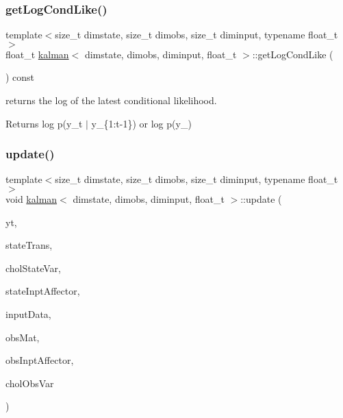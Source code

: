 \subsubsection{\texorpdfstring{get\+Log\+Cond\+Like()}{getLogCondLike()}}
{\footnotesize\ttfamily template$<$size\+\_\+t dimstate, size\+\_\+t dimobs, size\+\_\+t diminput, typename float\+\_\+t $>$ \\
float\+\_\+t \hyperlink{classkalman}{kalman}$<$ dimstate, dimobs, diminput, float\+\_\+t $>$\+::get\+Log\+Cond\+Like (\begin{DoxyParamCaption}{ }\end{DoxyParamCaption}) const}



returns the log of the latest conditional likelihood. 

\begin{DoxyReturn}{Returns}
log p(y\+\_\+t $\vert$ y\+\_\+\{1\+:t-\/1\}) or log p(y\+\_) 
\end{DoxyReturn}
\mbox{\label{classkalman_a55f914729a1d7de38a672c95b9efdaae}} 
\subsubsection{\texorpdfstring{update()}{update()}}
{\footnotesize\ttfamily template$<$size\+\_\+t dimstate, size\+\_\+t dimobs, size\+\_\+t diminput, typename float\+\_\+t $>$ \\
void \hyperlink{classkalman}{kalman}$<$ dimstate, dimobs, diminput, float\+\_\+t $>$\+::update (\begin{DoxyParamCaption}\item[{const \hyperlink{classkalman_a0172e54797a5d5b0acc4168894adc6d5}{osv} \&}]{yt,  }\item[{const \hyperlink{classkalman_a581550d9aba33245fb496b22a834831c}{ss\+Mat} \&}]{state\+Trans,  }\item[{const \hyperlink{classkalman_a581550d9aba33245fb496b22a834831c}{ss\+Mat} \&}]{chol\+State\+Var,  }\item[{const \hyperlink{classkalman_ab024c795f585385ee14aea92a5dccfbc}{si\+Mat} \&}]{state\+Inpt\+Affector,  }\item[{const \hyperlink{classkalman_abc570ce1b06e8a96a334f9226dfbce77}{isv} \&}]{input\+Data,  }\item[{const \hyperlink{classkalman_a28ffd71604fac7b25492b1b43379e046}{os\+Mat} \&}]{obs\+Mat,  }\item[{const \hyperlink{classkalman_a35298f18f0b699f700e2d55d94bf54fc}{oi\+Mat} \&}]{obs\+Inpt\+Affector,  }\item[{const \hyperlink{classkalman_a28ffd71604fac7b25492b1b43379e046}{os\+Mat} \&}]{chol\+Obs\+Var }\end{DoxyParamCaption})}



